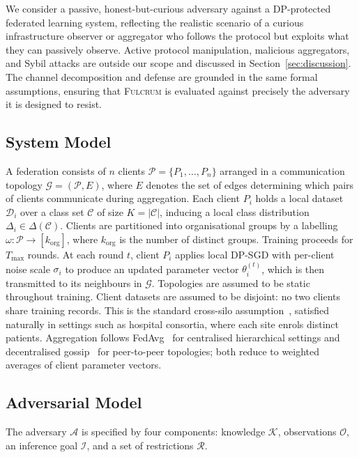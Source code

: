 \documentclass[letterpaper,journal]{IEEEtran}
\newcommand{\Fulcrum}{\textsc{Fulcrum}\xspace}
\begin{document}
We consider a passive, honest-but-curious adversary against a
DP-protected federated learning system, reflecting the realistic
scenario of a curious infrastructure observer or aggregator who
follows the protocol but exploits what they can passively observe.
Active protocol manipulation, malicious aggregators, and Sybil
attacks are outside our scope and discussed in
Section~\ref{sec:discussion}. The channel decomposition and defense
are grounded in the same formal assumptions, ensuring that \Fulcrum
is evaluated against precisely the adversary it is designed to
resist.

\subsection{System Model}
\label{sec:system-model}

A federation consists of $n$ clients $\mathcal{P} =
\{P_1,\ldots,P_n\}$ arranged in a communication topology
$\mathcal{G} = (\mathcal{P}, E)$, where $E$ denotes the set of edges
determining which pairs of clients communicate during aggregation.
Each client $P_i$ holds a local dataset $\mathcal{D}_i$ over a class
set $\mathcal{C}$ of size $K = |\mathcal{C}|$, inducing a local
class distribution $\Delta_i \in \Delta(\mathcal{C})$. Clients are
partitioned into organisational groups by a labelling $\omega :
\mathcal{P} \to [k_{\mathrm{org}}]$, where $k_{\mathrm{org}}$ is
the number of distinct groups. Training proceeds for $T_{\max}$
rounds. At each round $t$, client $P_i$ applies local DP-SGD with
per-client noise scale $\sigma_i$ to produce an updated parameter
vector $\theta_i^{(t)}$, which is then transmitted to its neighbours
in $\mathcal{G}$. Topologies are assumed to be static throughout
training. Client datasets are assumed to be disjoint: no two clients
share training records. This is the standard cross-silo
assumption~\cite{wang2021fieldguide}, satisfied naturally in settings
such as hospital consortia, where each site enrols distinct patients.
Aggregation follows FedAvg~\cite{mcmahan2018dpfedavg} for centralised
hierarchical settings and decentralised
gossip~\cite{hegedus2021decentralized} for peer-to-peer topologies;
both reduce to weighted averages of client parameter vectors.

\subsection{Adversarial Model}
\label{sec:adv-model}

The adversary $\mathcal{A}$ is specified by four components:
knowledge $\mathcal{K}$, observations $\mathcal{O}$, an inference
goal $\mathcal{I}$, and a set of restrictions $\mathcal{R}$.
\end{document}
